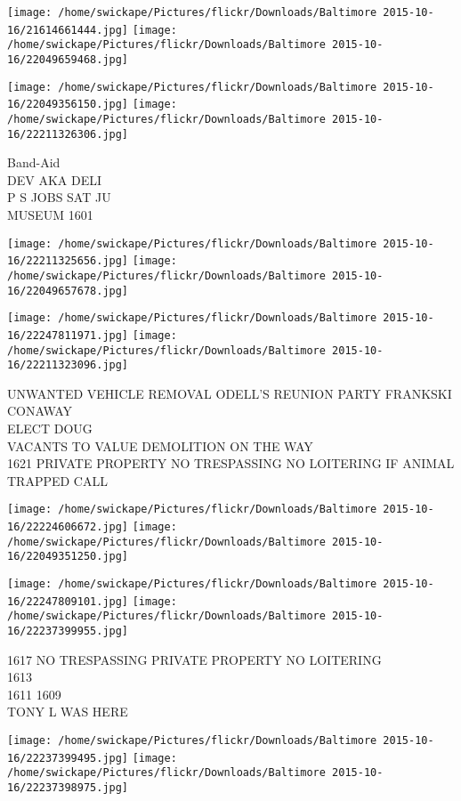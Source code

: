 \documentclass[10pt,letterpaper]{article}
\begin{document}
\texttt{[image: /home/swickape/Pictures/flickr/Downloads/Baltimore 2015-10-16/21614661444.jpg]}
\texttt{[image: /home/swickape/Pictures/flickr/Downloads/Baltimore 2015-10-16/22049659468.jpg]}

\texttt{[image: /home/swickape/Pictures/flickr/Downloads/Baltimore 2015-10-16/22049356150.jpg]}
\texttt{[image: /home/swickape/Pictures/flickr/Downloads/Baltimore 2015-10-16/22211326306.jpg]}

Band{-}Aid\\
DEV AKA DELI\\
P S JOBS SAT JU\\
MUSEUM 1601
\pagebreak

\texttt{[image: /home/swickape/Pictures/flickr/Downloads/Baltimore 2015-10-16/22211325656.jpg]}
\texttt{[image: /home/swickape/Pictures/flickr/Downloads/Baltimore 2015-10-16/22049657678.jpg]}

\texttt{[image: /home/swickape/Pictures/flickr/Downloads/Baltimore 2015-10-16/22247811971.jpg]}
\texttt{[image: /home/swickape/Pictures/flickr/Downloads/Baltimore 2015-10-16/22211323096.jpg]}

UNWANTED VEHICLE REMOVAL ODELL'S REUNION PARTY FRANKSKI CONAWAY\\
ELECT DOUG\\
VACANTS TO VALUE DEMOLITION ON THE WAY\\
1621 PRIVATE PROPERTY NO TRESPASSING NO LOITERING IF ANIMAL TRAPPED CALL
\pagebreak

\texttt{[image: /home/swickape/Pictures/flickr/Downloads/Baltimore 2015-10-16/22224606672.jpg]}
\texttt{[image: /home/swickape/Pictures/flickr/Downloads/Baltimore 2015-10-16/22049351250.jpg]}

\texttt{[image: /home/swickape/Pictures/flickr/Downloads/Baltimore 2015-10-16/22247809101.jpg]}
\texttt{[image: /home/swickape/Pictures/flickr/Downloads/Baltimore 2015-10-16/22237399955.jpg]}

1617 NO TRESPASSING PRIVATE PROPERTY NO LOITERING\\
1613\\
1611 1609\\
TONY L WAS HERE
\pagebreak

\texttt{[image: /home/swickape/Pictures/flickr/Downloads/Baltimore 2015-10-16/22237399495.jpg]}
\texttt{[image: /home/swickape/Pictures/flickr/Downloads/Baltimore 2015-10-16/22237398975.jpg]}
\end{document}

